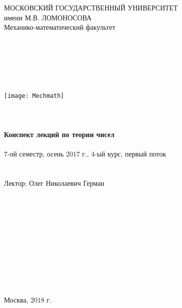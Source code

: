 \begin{center}~\\~\\~\\~\\~\\
	{\large МОСКОВСКИЙ ГОСУДАРСТВЕННЫЙ УНИВЕРСИТЕТ}\\
	{\large имени М.В. ЛОМОНОСОВА}\\
	{\large Механико-математический факультет}\\
	~\\~\\~\\~\\~\\~\\
	\texttt{[image: Mechmath]}
	~\\~\\~\\~\\
	{\LARGE \bf Конспект лекций по теории чисел}
	~\\~\\
	{\large $7$-ой семестр, осень $2017$ г., $4$-ый курс, первый поток}
	~\\~\\~\\
	{\large Лектор: Олег Николаевич Герман}
	~\\~\\~\\~\\~\\~\\~\\~\\~\\~\\~\\~\\
	Москва, $2018$ г.
\end{center}